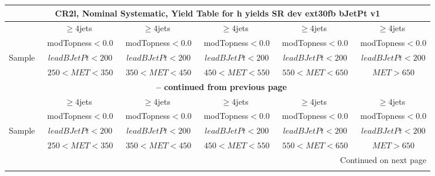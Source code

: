 \documentclass{article}
\begin{document}
\begin{longtable}{|l|c|c|c|c|c|} 
 
\multicolumn{6}{c}{ CR2l, Nominal Systematic, Yield Table for h yields SR dev ext30fb bJetPt v1 }\\* \hline 
  & $\ge4$jets  & $\ge4$jets  & $\ge4$jets  & $\ge4$jets  & $\ge4$jets \\* 
  & ~modTopness$<0.0$  & ~modTopness$<0.0$  & ~modTopness$<0.0$  & ~modTopness$<0.0$  & ~modTopness$<0.0$ \\* 
Sample  & ~$leadBJetPt<200$  & ~$leadBJetPt<200$  & ~$leadBJetPt<200$  & ~$leadBJetPt<200$  & ~$leadBJetPt<200$ \\* 
  & ~$250<MET<350$  & ~$350<MET<450$  & ~$450<MET<550$  & ~$550<MET<650$  & ~$MET>650$ \\* 
\hline \hline 
\endfirsthead 
 
\multicolumn{6}{c}{{\bfseries \tablename\ \thetable{} -- continued from previous page}}\\* \hline 
  & $\ge4$jets  & $\ge4$jets  & $\ge4$jets  & $\ge4$jets  & $\ge4$jets \\* 
  & ~modTopness$<0.0$  & ~modTopness$<0.0$  & ~modTopness$<0.0$  & ~modTopness$<0.0$  & ~modTopness$<0.0$ \\* 
Sample  & ~$leadBJetPt<200$  & ~$leadBJetPt<200$  & ~$leadBJetPt<200$  & ~$leadBJetPt<200$  & ~$leadBJetPt<200$ \\* 
  & ~$250<MET<350$  & ~$350<MET<450$  & ~$450<MET<550$  & ~$550<MET<650$  & ~$MET>650$ \\* 
\hline \hline 
\endhead 
 
\multicolumn{6}{|r|}{{Continued on next page}}\\* \hline 
\endfoot 
 
 
\endlastfoot 
 

\end{longtable}
\end{document}

